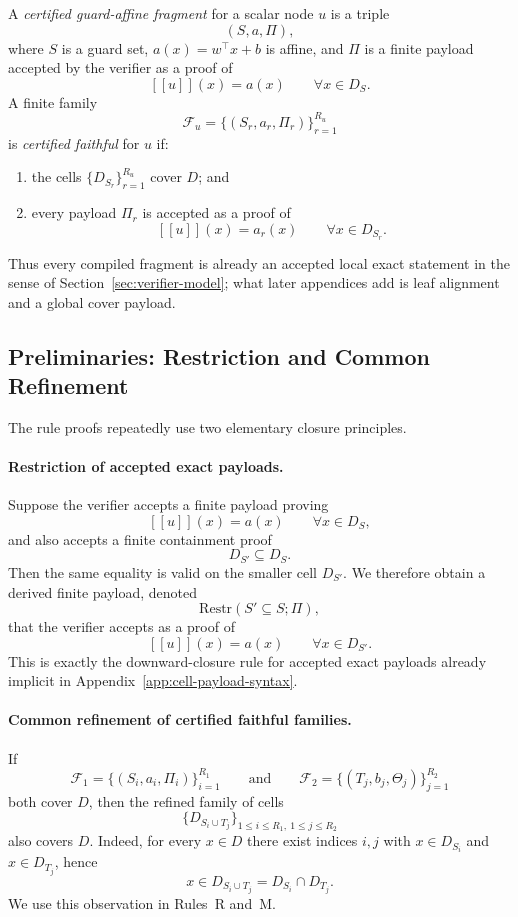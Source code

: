 A \emph{certified guard-affine fragment} for a scalar node $u$ is a triple
\[
 (S,a,\Pi),
\]
where $S$ is a guard set, $a(x)=w^\top x+b$ is affine, and $\Pi$ is a finite payload accepted by the verifier as a proof of
\[
 [[u]](x)=a(x)
 \qquad \forall x\in D_S.
\]
A finite family
\[
 \mathcal F_u=\{(S_r,a_r,\Pi_r)\}_{r=1}^{R_u}
\]
is \emph{certified faithful} for $u$ if:
\begin{enumerate}
    \item the cells $\{D_{S_r}\}_{r=1}^{R_u}$ cover $D$; and
    \item every payload $\Pi_r$ is accepted as a proof of
    \[
    [[u]](x)=a_r(x)
    \qquad \forall x\in D_{S_r}.
    \]
\end{enumerate}
Thus every compiled fragment is already an accepted local exact statement in the sense of Section~\ref{sec:verifier-model}; what later appendices add is leaf alignment and a global cover payload.

\subsection{Preliminaries: Restriction and Common Refinement}

The rule proofs repeatedly use two elementary closure principles.

\paragraph{Restriction of accepted exact payloads.}
Suppose the verifier accepts a finite payload proving
\[
 [[u]](x)=a(x)
 \qquad \forall x\in D_S,
\]
and also accepts a finite containment proof
\[
 D_{S'}\subseteq D_S.
\]
Then the same equality is valid on the smaller cell $D_{S'}$. We therefore obtain a derived finite payload, denoted
\[
 \mathrm{Restr}(S'\subseteq S;\Pi),
\]
that the verifier accepts as a proof of
\[
 [[u]](x)=a(x)
 \qquad \forall x\in D_{S'}.
\]
This is exactly the downward-closure rule for accepted exact payloads already implicit in Appendix~\ref{app:cell-payload-syntax}.

\paragraph{Common refinement of certified faithful families.}
If
\[
 \mathcal F_1=\{(S_i,a_i,\Pi_i)\}_{i=1}^{R_1}
 \qquad\text{and}\qquad
 \mathcal F_2=\{(T_j,b_j,\Theta_j)\}_{j=1}^{R_2}
\]
both cover $D$, then the refined family of cells
\[
 \{D_{S_i\cup T_j}\}_{1\le i\le R_1,\ 1\le j\le R_2}
\]
also covers $D$. Indeed, for every $x\in D$ there exist indices $i,j$ with $x\in D_{S_i}$ and $x\in D_{T_j}$, hence
\[
 x\in D_{S_i\cup T_j}=D_{S_i}\cap D_{T_j}.
\]
We use this observation in Rules~R and~M.

